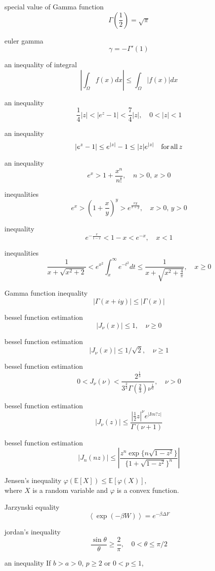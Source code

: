 special value of Gamma function
$$
\Gamma\left(\frac{1}{2}\right)=\sqrt{\pi}
$$

euler gamma
$$
\gamma=-\Gamma'(1)
$$

an inequality of integral
$$
\left|\int_\Omega f(x)dx\right| \le \int_\Omega \left|f(x)\right|dx
$$

an inequality
$$
\frac{1}{4}|z|<\left|e^z-1\right|<\frac{7}{4}|z|, \quad 0<|z|<1
$$

an inequality
$$
\left|e^z-1\right|\le e^{|z|}-1\le |z|e^{|z|} \quad {\rm for}\,{\rm all}\,z
$$

an inequality
$$
e^x>1+\frac{x^n}{n!}, \quad n>0,\,x>0
$$

inequalities
$$
e^x>\left(1+\frac{x}{y}\right)^y>e^{\frac{xy}{x+y}}, \quad x>0,\,y>0
$$

inequality
$$
e^{-\frac{x}{1-x}}<1-x<e^{-x}, \quad x<1
$$

inequalities
$$
\frac{1}{x+\sqrt{x^2+2}}<e^{x^2}\int^\infty_x e^{-t^2}dt\le \frac{1}{x+\sqrt{x^2+\frac{4}{\pi}}},  \quad x\ge 0
$$

Gamma function inequality
$$
|\Gamma(x+iy)| \le |\Gamma(x)|
$$

bessel function estimation
$$
|J_\nu(x)| \le 1, \quad \nu \ge 0
$$

bessel function estimation
$$
|J_\nu(x)| \le 1/\sqrt{2}, \quad \nu \ge 1
$$

bessel function estimation
$$
0<J_\nu(\nu)<\frac{2^{\frac{1}{3}}}{3^{\frac{2}{3}}\Gamma\left(\frac{2}{3}\right)\nu^{\frac{1}{3}}}, \quad \nu>0
$$

bessel function estimation
$$
\left|J_\nu(z)\right|\le\frac{\left|\frac{1}{2}z\right|^\nu e^{|Im? z|}}{\Gamma(\nu+1)}
$$

bessel function estimation
$$
|J_n(nz)| \le \left|\frac{z^n\exp\{n\sqrt{1-z^2}\}}{\{1+\sqrt{1-z^2}\}^n}\right|
$$

Jensen's inequality
$
\varphi(\mathbb{E}[X]) \le \mathbb{E}[\varphi(X)],
$
\\
where $X$ is a random variable and $\varphi$ is a convex function.

Jarzynski equality
$$
\left<\exp(-\beta W)\right>=e^{-\beta \Delta F}
$$

jordan’s inequality
$$
\frac{\sin\theta}{\theta}\ge \frac{2}{\pi}, \quad 0<\theta\le \pi/2
$$

an inequality
If $b>a>0$, $p \ge 2$ or $0<p \le 1$,

